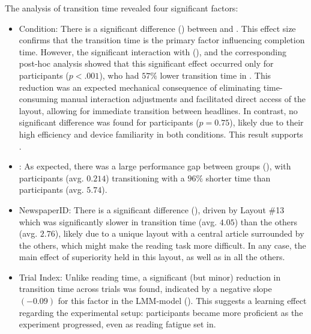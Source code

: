 The analysis of transition time revealed four significant factors:
\begin{itemize}
    \item {Condition}: There is a significant difference () between \condonenot and \condtwonot {}. This effect size confirms that the transition time is the primary factor influencing completion time. However, the significant interaction with \CVAS (), and the corresponding post-hoc analysis showed that this significant effect occurred only for participants \LV ($p <.001$), who had $57\%$ lower transition time in \condtwonot {}. This reduction was an expected mechanical consequence of eliminating time-consuming manual interaction adjustments and facilitated direct access of the layout, allowing for immediate transition between headlines. In contrast, no significant difference was found for participants \NV ($p = 0.75$), likely due to their high efficiency and device familiarity in both conditions. This result supports \hypperformance.

    \item {\CVAS:} As expected, there was a large performance gap between groups (), with participants \NV (avg. $0.214$\seconds) transitioning with a $96\%$ shorter time than participants \LV (avg. $5.74$\seconds).

    \item {NewspaperID:} There is a significant difference (), driven by Layout \#13 which  was significantly slower in transition time (avg. $4.05$\seconds) than the others (avg. $2.76$\seconds), likely due to a unique layout with a central article surrounded by the others, which might make the reading task more difficult. In any case, the main effect of \condtwonot superiority held in this layout, as well as in all the others.

    \item {Trial Index:} Unlike reading time, a significant (but minor) reduction in transition time across trials was found, indicated by a negative slope $(-0.09)$ for this factor in the LMM-model  (). This suggests a learning effect regarding the experimental setup: participants became more proficient as the experiment progressed, even as reading fatigue set in.
\end{itemize}

